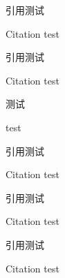 \documentclass{article}
\begin{document}
\begin{multicols}{2}
引用\cite{sally_history_1985,foo}测试\par
Citation \cite{sally_history_1985,foo} test\par
引用\parencite{sally_history_1985,foo}测试\par
Citation \parencite{sally_history_1985,foo} test\par
\citet{sally_history_1985,foo}测试\par
\citet{sally_history_1985,foo} test\par
引用\citep{sally_history_1985,foo}测试\par
Citation \citep{sally_history_1985,foo} test\par
引用\textcite{sally_history_1985,foo}测试\par
Citation \textcite{sally_history_1985,foo} test\par
引用测试\par
Citation  test\par

\end{multicols}

\printbibliography
\end{document}
